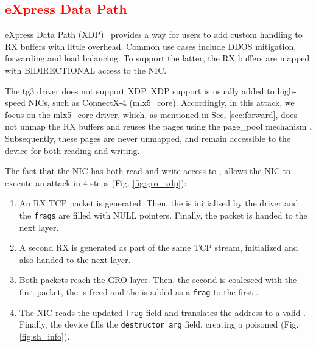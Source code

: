 
\subsection{\textcolor{red}{\textbf{eXpress Data Path}}}\label{sec:xdp}

eXpress Data Path (XDP)~\cite{xdp} provides a way for users to add custom handling to RX buffers with little overhead. Common use cases include DDOS mitigation, forwarding and load balancing. To support the latter, the RX buffers are mapped with BIDIRECTIONAL access to the NIC. 

The tg3 driver does not support XDP. XDP support is usually added to high-speed NICs, such as ConnectX-4 (mlx5\_core). Accordingly, in this attack, we focus on the mlx5\_core driver, which, as mentioned in Sec, \ref{sec:forward}, does not unmap the RX buffers and reuses the pages using the page\_pool mechanism \cite{page_pool}. Subsequently, these pages are never unmapped, and remain accessible to the device for both reading and writing. 

The fact that the NIC has both read and write access to \shinfo, allows the NIC to execute an attack in 4 steps (Fig. \ref{fig:gro_xdp}):
\begin{enumerate}
    \item An RX TCP packet is generated. Then, the \shinfo{} is initialised by the driver and the \texttt{frags} are filled with NULL pointers. Finally, the packet is handed to the next layer.
    
    \item A second RX \skb{} is generated as part of the same TCP stream, initialized and also handed to the next layer.
    
    \item Both packets reach the GRO layer. Then, the second \skb{} is coalesced with the first packet, the \skb{} is freed and the \data{} is added as a \texttt{frag} to the first \skb.
    
    \item The NIC reads the updated \texttt{frag} field and translates the \page{} address to a valid \kva{}. Finally, the device fills the \texttt{destructor\_arg} field, creating a poisoned \skb{} (Fig. \ref{fig:sh_info}).
\end{enumerate}


